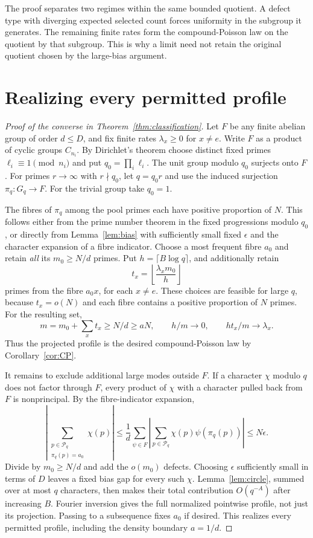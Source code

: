 \documentclass[11pt]{article}
\theoremstyle{remark}\newtheorem{remark}[theorem]{Remark}
\begin{document}
The proof separates two regimes within the same bounded quotient. A defect type with diverging expected selected count forces uniformity in the subgroup it generates. The remaining finite rates form the compound-Poisson law on the quotient by that subgroup. This is why a limit need not retain the original quotient chosen by the large-bias argument.

\section{Realizing every permitted profile}\label{sec:realization}

\begin{proof}[Proof of the converse in Theorem~\ref{thm:classification}]
Let $F$ be any finite abelian group of order $d\le D$, and fix finite rates $\lambda_x\ge0$ for $x\ne e$. Write $F$ as a product of cyclic groups $C_{n_i}$. By Dirichlet's theorem choose distinct fixed primes $\ell_i\equiv1\pmod{n_i}$ and put $q_0=\prod_i\ell_i$. The unit group modulo $q_0$ surjects onto $F$. For primes $r\to\infty$ with $r\nmid q_0$, let $q=q_0r$ and use the induced surjection $\pi_q:G_q\to F$. For the trivial group take $q_0=1$.

The fibres of $\pi_q$ among the pool primes each have positive proportion of $N$. This follows either from the prime number theorem in the fixed progressions modulo $q_0$, or directly from Lemma~\ref{lem:bias} with sufficiently small fixed $\epsilon$ and the character expansion of a fibre indicator. Choose a most frequent fibre $a_0$ and retain \emph{all} its $m_0\ge N/d$ primes. Put $h=\lceil B\log q\rceil$, and additionally retain
\[
 t_x=\left\lfloor\frac{\lambda_xm_0}{h}\right\rfloor
\]
primes from the fibre $a_0x$, for each $x\ne e$. These choices are feasible for large $q$, because $t_x=o(N)$ and each fibre contains a positive proportion of $N$ primes. For the resulting set,
\[
 m=m_0+\sum_xt_x\ge N/d\ge aN,\qquad
 h/m\to0,\qquad ht_x/m\to\lambda_x.
\]
Thus the projected profile is the desired compound-Poisson law by Corollary~\ref{cor:CP}.

It remains to exclude additional large modes outside $F$. If a character $\chi$ modulo $q$ does not factor through $F$, every product of $\chi$ with a character pulled back from $F$ is nonprincipal. By the fibre-indicator expansion,
\[
 \left|\sum_{\substack{p\in\mathcal P_q\\\pi_q(p)=a_0}}\chi(p)\right|
 \le\frac1d\sum_{\psi\in\widehat F}
       \left|\sum_{p\in\mathcal P_q}\chi(p)\psi(\pi_q(p))\right|
 \le N\epsilon.
\]
Divide by $m_0\ge N/d$ and add the $o(m_0)$ defects. Choosing $\epsilon$ sufficiently small in terms of $D$ leaves a fixed bias gap for every such $\chi$. Lemma~\ref{lem:circle}, summed over at most $q$ characters, then makes their total contribution $O(q^{-A})$ after increasing $B$. Fourier inversion gives the full normalized pointwise profile, not just its projection. Passing to a subsequence fixes $a_0$ if desired. This realizes every permitted profile, including the density boundary $a=1/d$.
\end{proof}
\end{document}

